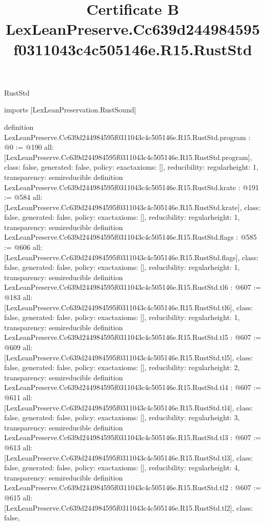 \begin{lexlean}{RustStd}
\title{Certificate B LexLeanPreserve.Cc639d244984595f0311043c4c505146e.R15.RustStd}
\begin{coremodule}
imports [LexLeanPreservation.RustSound]

definition LexLeanPreserve.Cc639d244984595f0311043c4c505146e.R15.RustStd.program : @0 := @190 {
  all: [LexLeanPreserve.Cc639d244984595f0311043c4c505146e.R15.RustStd.program],
  class: false,
  generated: false,
  policy: exact{axioms: []},
  reducibility: regular{height: 1},
  transparency: semireducible
}
definition LexLeanPreserve.Cc639d244984595f0311043c4c505146e.R15.RustStd.krate : @191 := @584 {
  all: [LexLeanPreserve.Cc639d244984595f0311043c4c505146e.R15.RustStd.krate],
  class: false,
  generated: false,
  policy: exact{axioms: []},
  reducibility: regular{height: 1},
  transparency: semireducible
}
definition LexLeanPreserve.Cc639d244984595f0311043c4c505146e.R15.RustStd.flags : @585 := @606 {
  all: [LexLeanPreserve.Cc639d244984595f0311043c4c505146e.R15.RustStd.flags],
  class: false,
  generated: false,
  policy: exact{axioms: []},
  reducibility: regular{height: 1},
  transparency: semireducible
}
definition LexLeanPreserve.Cc639d244984595f0311043c4c505146e.R15.RustStd.tl6 : @607 := @183 {
  all: [LexLeanPreserve.Cc639d244984595f0311043c4c505146e.R15.RustStd.tl6],
  class: false,
  generated: false,
  policy: exact{axioms: []},
  reducibility: regular{height: 1},
  transparency: semireducible
}
definition LexLeanPreserve.Cc639d244984595f0311043c4c505146e.R15.RustStd.tl5 : @607 := @609 {
  all: [LexLeanPreserve.Cc639d244984595f0311043c4c505146e.R15.RustStd.tl5],
  class: false,
  generated: false,
  policy: exact{axioms: []},
  reducibility: regular{height: 2},
  transparency: semireducible
}
definition LexLeanPreserve.Cc639d244984595f0311043c4c505146e.R15.RustStd.tl4 : @607 := @611 {
  all: [LexLeanPreserve.Cc639d244984595f0311043c4c505146e.R15.RustStd.tl4],
  class: false,
  generated: false,
  policy: exact{axioms: []},
  reducibility: regular{height: 3},
  transparency: semireducible
}
definition LexLeanPreserve.Cc639d244984595f0311043c4c505146e.R15.RustStd.tl3 : @607 := @613 {
  all: [LexLeanPreserve.Cc639d244984595f0311043c4c505146e.R15.RustStd.tl3],
  class: false,
  generated: false,
  policy: exact{axioms: []},
  reducibility: regular{height: 4},
  transparency: semireducible
}
definition LexLeanPreserve.Cc639d244984595f0311043c4c505146e.R15.RustStd.tl2 : @607 := @615 {
  all: [LexLeanPreserve.Cc639d244984595f0311043c4c505146e.R15.RustStd.tl2],
  class: false,
}
\end{coremodule}
\end{lexlean}
